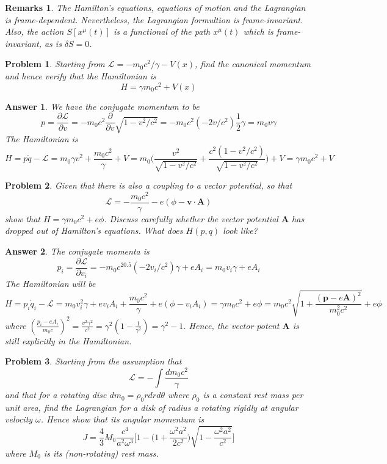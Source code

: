 \documentclass[a4paper]{article}
\newtheorem{ans}{Answer}[section]
\newtheorem{remarks}{Remarks}[section]
\theoremstyle{new}
\newtheorem{qns}{Problem}[section]
\begin{document}
\begin{remarks}
The Hamilton's equations, equations of motion and the Lagrangian is frame-dependent. Nevertheless, the Lagrangian formultion is frame-invariant. Also, the action $S[x^\mu(t)]$ is a functional of the path $x^\mu(t)$ which is frame-invariant, as is $\delta S=0$.
\end{remarks}
\begin{qns}
Starting from $\mathcal{L}=-m_0c^2/\gamma -V(x)$, find the canonical momentum and hence verify that the Hamiltonian is
$$H=\gamma m_0c^2+V(x)$$
\end{qns}
\begin{ans}
We have the conjugate momentum to be 
$$p=\frac{\partial\mathcal{L}}{\partial v}=-m_0c^2\frac{\partial}{\partial v}\sqrt{1-v^2/c^2}=-m_0c^2(-2v/c^2)\frac{1}{2}\gamma=m_0v\gamma$$
The Hamiltonian is 
$$H=p\dot{q}-\mathcal{L}=m_0\gamma v^2+\frac{m_0c^2}{\gamma}+V=m_0\bigg(\frac{v^2}{\sqrt{1-v^2/c^2}}+\frac{c^2(1-v^2/c^2)}{\sqrt{1-v^2/c^2}}\bigg)+V=\gamma m_0c^2+V$$
\end{ans}
\begin{qns}
Given that there is also a coupling to a vector potential, so that
$$\mathcal{L}=-\frac{m_0c^2}{\gamma}-e(\phi-\mathbf{v}\cdot\mathbf{A})$$
show that $H=\gamma m_0c^2+e\phi$. Discuss carefully whether the vector potential $\mathbf{A}$ has dropped out of Hamilton’s equations. What does $H(p,q)$ look like?
\end{qns}
\begin{ans}
The conjugate momenta is
$$p_i=\frac{\partial\mathcal{L}}{\partial v_i}=-m_0c^20.5(-2v_i/c^2)\gamma+eA_i=m_0v_i\gamma+eA_i$$
The Hamiltonian will be
$$H=p_i\dot{q}_i-\mathcal{L}=m_0v_i^2\gamma+ev_iA_i+\frac{m_0c^2}{\gamma}+e(\phi-v_iA_i)=\gamma m_0c^2+e\phi=m_0c^2\sqrt{1+\frac{(\mathbf{p}-e\mathbf{A})^2}{m_0^2c^2}}+e\phi$$
where $(\frac{p_i-eA_i}{m_0c})^2=\frac{v^2\gamma^2}{c^2}=\gamma^2(1-\frac{1}{\gamma^2})=\gamma^2-1$. Hence, the vector potent $\mathbf{A}$ is still explicitly in the Hamiltonian.
\end{ans}
\begin{qns}
Starting from the assumption that
$$\mathcal{L}=-\int\frac{dm_0c^2}{\gamma}$$
and that for a rotating disc $dm_0=\rho_0rdrd\theta$
where $\rho_0$ is a constant rest mass per unit area, find the Lagrangian for a disk of radius a rotating rigidly at angular velocity $\omega$. Hence show that its angular momentum is
$$J=\frac{4}{3}M_0\frac{c^4}{a^2\omega^3}\bigg[1-\bigg(1+\frac{\omega^2a^2}{2c^2}\bigg)\sqrt{1-\frac{\omega^2a^2}{c^2}}\bigg]$$
where $M_0$ is its (non-rotating) rest mass.
\end{qns}
\end{document}
